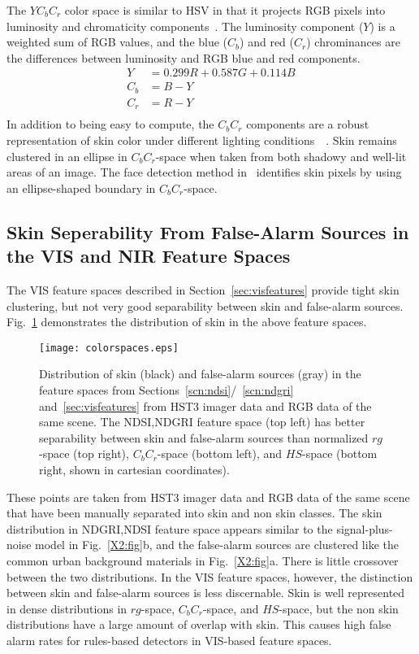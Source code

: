 \documentclass[10pt,journal,cspaper,compsoc]{IEEEtran}
\begin{document}
The $YC_bC_r$ color space is similar to HSV in that it projects RGB pixels into luminosity and chromaticity components~\cite{Vezhnevets1}. 
The luminosity component ($Y$) is a weighted sum of RGB values, and the blue ($C_b$) and red ($C_r$) chrominances are the differences 
between luminosity and RGB blue and red components.
\begin{equation}
\label{eq:ycbcr}
\begin{split}
Y &= 0.299R+0.587G+0.114B \\
C_b &= B-Y \\
C_r &= R-Y \\
\end{split}
\end{equation}
In addition to being easy to compute, the $C_bC_r$ components are a robust representation of skin color under different lighting 
conditions~\cite{Vezhnevets1}~\cite{Albiol1}. Skin remains clustered in an ellipse in $C_bC_r$-space when taken from both shadowy and well-lit 
areas of an image. The face detection method in~\cite{Hsu1} identifies skin pixels by using an ellipse-shaped boundary in $C_bC_r$-space. 

\subsection{Skin Seperability From False-Alarm Sources in the VIS and NIR Feature Spaces}
\label{sec:separability}
The VIS feature spaces described in Section~\ref{sec:visfeatures} provide tight skin clustering, but not very good separability between skin and false-alarm sources. 
Fig.~\ref{fig:colorfeatures} demonstrates the distribution of skin in the above feature spaces. 
\begin{figure}[t]
\begin{center}
\texttt{[image: colorspaces.eps]}
\caption{Distribution of skin (black) and false-alarm sources (gray) in the feature spaces from Sections~\ref{scn:ndsi}/~\ref{scn:ndgri} and~\ref{sec:visfeatures} from 
HST3 imager data and RGB data of the same scene. The NDSI,NDGRI feature space (top left) has better separability between skin and 
false-alarm sources than normalized $rg$-space (top right), $C_bC_r$-space (bottom left), and $HS$-space (bottom right, shown in cartesian coordinates).}
\label{fig:colorfeatures}
\end{center}
\end{figure}
These points are taken from HST3 imager data and RGB data of the same scene that have been manually separated into skin and non skin classes. 
The skin distribution in NDGRI,NDSI feature space appears similar to the signal-plus-noise model in Fig.~\ref{X2:fig}b, and the false-alarm sources 
are clustered like the common urban background materials in Fig.~\ref{X2:fig}a. There is little crossover between the two distributions. In the VIS 
feature spaces, however, the distinction between skin and false-alarm sources is less discernable. Skin is well represented in dense distributions 
in $rg$-space, $C_bC_r$-space, and $HS$-space, but the non skin distributions have a large amount of overlap with skin. This causes high false alarm 
rates for rules-based detectors in VIS-based feature spaces.
\end{document}
